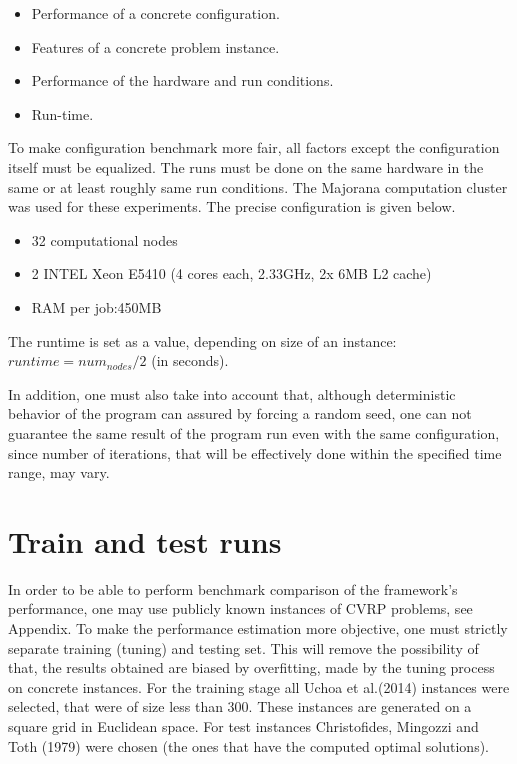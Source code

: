 \documentclass[12pt,a4paper,oneside]{book}
\begin{document}
\begin{itemize}
\item Performance of a concrete configuration.
\item Features of a concrete problem instance.
\item Performance of the hardware and run conditions.
\item Run-time.
\end{itemize}

To make configuration benchmark more fair, all factors except the configuration itself must be equalized. The runs must be done on the same hardware in the same or at least roughly same run conditions. The Majorana computation cluster was used for these experiments. The precise configuration is given below.
\begin{itemize}
\item 32 computational nodes
\item 2 INTEL Xeon E5410 (4 cores each, 2.33GHz, 2x 6MB L2 cache)
\item RAM per job:450MB
\end{itemize}

The runtime is set as a value, depending on size of an instance: $runtime = num_{nodes} / 2$ (in seconds).

In addition, one must also take into account that, although deterministic behavior of the program can assured by forcing a random seed, one can not guarantee the same result of the program run even with the same configuration, since number of iterations, that will be effectively done within the specified time range, may vary.

\section{Train and test runs}

In order to be able to perform benchmark comparison of the framework's performance, one may use publicly known instances of CVRP problems, see Appendix. To make the performance estimation more objective, one must strictly separate training (tuning) and testing set. This will remove the possibility of that, the results obtained are biased by overfitting, made by the tuning process on concrete instances. For the training stage all Uchoa et al.(2014) instances were selected, that were of size less than 300. These instances are generated on a square grid in Euclidean space. For test instances Christofides, Mingozzi and Toth (1979) were chosen (the ones that have the computed optimal solutions).
\end{document}
